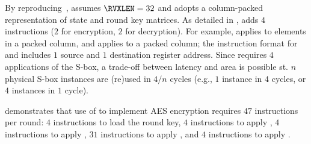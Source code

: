 
By reproducing~\cite[Section 4.2]{TilGro:06},
assumes 
$\RVXLEN = 32$
and adopts a 
column-packed 
representation of state and round key matrices.
As detailed in
,
adds
$ 4$
instructions ($2$ for encryption, $2$ for decryption).
For example,
applies 
to elements in   a packed column,
and
applies 
to               a packed column;
the instruction format for
and
includes $1$ source and $1$ destination register address.
Since 
requires $4$ applications of the S-box, a trade-off between latency and
area is possible st. 
$n$ physical S-box instances are (re)used in $4/n$ cycles
(e.g., $1$ instance in $4$ cycles, or $4$ instances in $1$ cycle).

demonstrates that use of  to implement AES encryption requires
$47$ instructions per round:
$ 4$            
     instructions to load the round key,
$ 4$            
     instructions to apply ,
$ 4$   
     instructions to apply ,
$31$ instructions to apply ,
and
$ 4$   
     instructions to apply .

